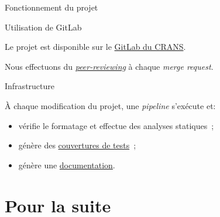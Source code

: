 \documentclass[12pt, aspectratio=169]{beamer}
\begin{document}
        \begin{frame}{Fonctionnement du projet}

            \begin{block}{Utilisation de GitLab}

                Le projet est disponible sur le \href{https://gitlab.crans.org/loutr/proost}{GitLab du CRANS}. \pause

                \vspace{.3cm}

                Nous effectuons du \href{https://gitlab.crans.org/loutr/proost/-/merge_requests/60}{\textit{peer-reviewing}} à chaque \textit{merge request}.

            \end{block}

            \vfill

            \begin{block}{Infrastructure}

                À chaque modification du projet, une \textit{pipeline} s'exécute et: \pause
                \begin{itemize}
                    \item vérifie le formatage et effectue des analyses statiques~; \pause
                    \item génère des \href{https://perso.crans.org/v-lafeychine/proost/coverage/main/index.html}{couvertures de tests}~; \pause
                    \item génère une \href{https://perso.crans.org/v-lafeychine/proost/doc/proost/}{documentation}.
                \end{itemize}

            \end{block}

        \end{frame}

    \section{Pour la suite}
\end{document}

